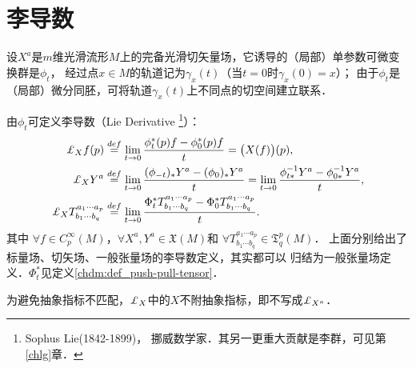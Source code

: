%



\section{李导数}\label{chdm:sec_Lie-Derivative}
设$X^a$是$m$维光滑流形$M$上的完备光滑切矢量场，它诱导的（局部）单参数可微变换群是$\phi_t$，
经过点$x\in M$的轨道记为$\gamma_x(t)$（当$t=0$时$\gamma_x(0)=x$）；
由于$\phi_t$是（局部）微分同胚，可将轨道$\gamma_x(t)$上不同点的切空间建立联系．
\begin{definition}
    由$\phi_t$可定义李导数（Lie Derivative {\footnote{Sophus Lie(1842-1899)，
            挪威数学家．其另一更重大贡献是李群，可见第\ref{chlg}章．}}）：
    \begin{align}
        \Lie_{X} f(p) &\overset{def}{=} \lim_{t\to 0}
        \frac{\phi^{*}_{t}(p) f-\phi^{*}_{0}(p)f}{t} = \bigl(X(f)\bigr)(p), \label{chdm:def_LieD-scalar} \\
        \Lie_{X} Y^{a} &\overset{def}{=} \lim_{t\to 0}
        \frac{(\phi_{-t})_{*} Y^{a}-(\phi_{0})_{*}Y^{a}}{t}=\lim_{t\to 0}
        \frac{\phi^{-1}_{t*} Y^{a}-\phi^{-1}_{0*}Y^{a}}{t},  \label{chdm:def_LieD-vector} \\
        \Lie_{X} T_{b_1\cdots b_q}^{a_1\cdots a_p} &\overset{def}{=} \lim_{t\to 0}
        \frac{\Phi^{*}_{t} T_{b_1\cdots b_q}^{a_1\cdots a_p}-\Phi^{*}_{0}T_{b_1\cdots b_q}^{a_1\cdots a_p}}{t} .
          \label{chdm:def_LieD-tensor}
    \end{align}
    其中 $\forall f \in C^\infty_p(M)$，$\forall X^a, Y^{a} \in \mathfrak{X}(M) $和
    $\forall T_{b_1\cdots b_q}^{a_1\cdots a_p} \in \mathfrak{T}^p_q(M)$．
    上面分别给出了标量场、切矢场、一般张量场的李导数定义，其实都可以
    归结为一般张量场定义．$\Phi^{*}_{t}$见定义\ref{chdm:def_push-pull-tensor}．
\end{definition}

\begin{remark}\label{chdm:rek_lieabstnoa}
    为避免抽象指标不匹配，$\Lie_{X}$中的$X$不附抽象指标，即不写成$\Lie_{X^a}$．
\end{remark}


